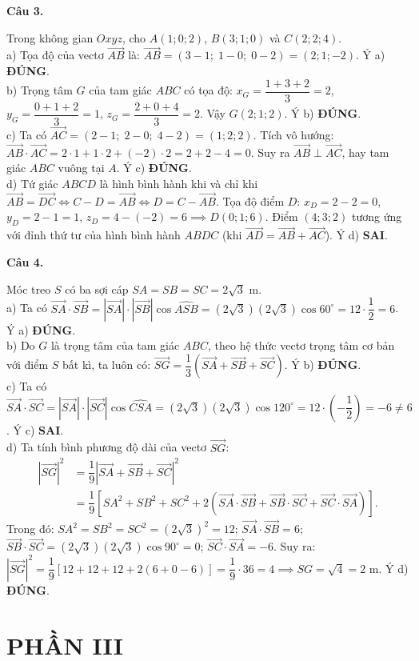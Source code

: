 \documentclass[12pt,a4paper]{article}
\newcommand{\loigiai}[1]{\par\medskip\Needspace{4\baselineskip}\noindent\textbf{#1}\par\nobreak}
\begin{document}
\loigiai{Câu 3.}
Trong không gian $Oxyz$, cho $A(1;0;2)$, $B(3;1;0)$ và $C(2;2;4)$.\\
a) Tọa độ của vectơ $\vec{AB}$ là:
$\vec{AB}=(3-1;\; 1-0;\; 0-2)=(2;1;-2)$. Ý a) \textbf{ĐÚNG}.\\
b) Trọng tâm $G$ của tam giác $ABC$ có tọa độ:
$x_G=\dfrac{1+3+2}{3}=2$, $y_G=\dfrac{0+1+2}{3}=1$, $z_G=\dfrac{2+0+4}{3}=2$.
Vậy $G(2;1;2)$. Ý b) \textbf{ĐÚNG}.\\
c) Ta có $\vec{AC}=(2-1;\; 2-0;\; 4-2)=(1;2;2)$.
Tích vô hướng: $\vec{AB}\cdot\vec{AC}=2\cdot 1 + 1\cdot 2 + (-2)\cdot 2 = 2+2-4=0$.
Suy ra $\vec{AB}\perp\vec{AC}$, hay tam giác $ABC$ vuông tại $A$. Ý c) \textbf{ĐÚNG}.\\
d) Tứ giác $ABCD$ là hình bình hành khi và chỉ khi $\vec{AB}=\vec{DC} \iff C-D=\vec{AB} \iff D=C-\vec{AB}$.
Tọa độ điểm $D$: $x_D=2-2=0$, $y_D=2-1=1$, $z_D=4-(-2)=6 \implies D(0;1;6)$.
Điểm $(4;3;2)$ tương ứng với đỉnh thứ tư của hình bình hành $ABDC$ (khi $\vec{AD}=\vec{AB}+\vec{AC}$). Ý d) \textbf{SAI}.

\loigiai{Câu 4.}
Móc treo $S$ có ba sợi cáp $SA=SB=SC=2\sqrt{3}\text{ m}$.\\
a) Ta có $\vec{SA}\cdot\vec{SB}=|\vec{SA}|\cdot|\vec{SB}|\cos\widehat{ASB}=(2\sqrt{3})(2\sqrt{3})\cos 60^\circ=12\cdot\dfrac{1}{2}=6$. Ý a) \textbf{ĐÚNG}.\\
b) Do $G$ là trọng tâm của tam giác $ABC$, theo hệ thức vectơ trọng tâm cơ bản với điểm $S$ bất kì, ta luôn có:
$\vec{SG}=\dfrac{1}{3}(\vec{SA}+\vec{SB}+\vec{SC})$. Ý b) \textbf{ĐÚNG}.\\
c) Ta có $\vec{SA}\cdot\vec{SC}=|\vec{SA}|\cdot|\vec{SC}|\cos\widehat{CSA}=(2\sqrt{3})(2\sqrt{3})\cos 120^\circ=12\cdot\left(-\dfrac{1}{2}\right)=-6\ne 6$. Ý c) \textbf{SAI}.\\
d) Ta tính bình phương độ dài của vectơ $\vec{SG}$:
\begin{align*}
|\vec{SG}|^2 &= \dfrac{1}{9}|\vec{SA}+\vec{SB}+\vec{SC}|^2\\
&= \dfrac{1}{9}\left[SA^2+SB^2+SC^2+2(\vec{SA}\cdot\vec{SB}+\vec{SB}\cdot\vec{SC}+\vec{SC}\cdot\vec{SA})\right].
\end{align*}
Trong đó: $SA^2=SB^2=SC^2=(2\sqrt{3})^2=12$;
$\vec{SA}\cdot\vec{SB}=6$;
$\vec{SB}\cdot\vec{SC}=(2\sqrt{3})(2\sqrt{3})\cos 90^\circ=0$;
$\vec{SC}\cdot\vec{SA}=-6$.
Suy ra:
$|\vec{SG}|^2=\dfrac{1}{9}\left[12+12+12+2(6+0-6)\right]=\dfrac{1}{9}\cdot 36 = 4 \implies SG=\sqrt{4}=2\text{ m}$. Ý d) \textbf{ĐÚNG}.

\section*{PHẦN III}
\end{document}
